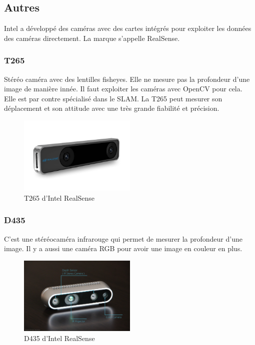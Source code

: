 \documentclass[a4paper, 11pt]{report}
\begin{document}
\subsection{Autres}
Intel a développé des caméras avec des cartes intégrés pour exploiter les données des caméras directement. La marque s'appelle RealSense.

\subsubsection{T265}
Stéréo caméra avec des lentilles fisheyes. Elle ne mesure pas la profondeur d'une image de manière innée. Il faut exploiter les caméras avec OpenCV pour cela. Elle est par contre spécialisé dans le SLAM. La T265 peut mesurer son déplacement et son attitude avec une très grande fiabilité et précision.

\begin{figure}[h!]
\begin{centering}
\includegraphics[width=0.5\textwidth]{images/T265.png}
\caption{T265 d'Intel RealSense}
\par\end{centering}
\end{figure}

\subsubsection{D435}
C'est une stéréocaméra infrarouge qui permet de mesurer la profondeur d'une image. Il y a aussi une caméra RGB pour avoir une image en couleur en plus.

\begin{figure}[h!]
\begin{centering}
\includegraphics[width=0.5\textwidth]{images/D435.jpg}
\caption{D435 d'Intel RealSense}
\par\end{centering}
\end{figure}
\end{document}
